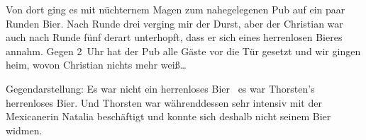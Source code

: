 Von dort ging es mit nüchternem Magen zum nahegelegenen Pub  auf ein paar Runden Bier.
Nach Runde drei verging mir der Durst, aber der Christian war auch nach Runde fünf derart unterhopft, dass er sich eines herrenlosen Bieres annahm.
Gegen 2~Uhr hat der Pub alle Gäste vor die Tür gesetzt und wir gingen heim, wovon Christian nichts mehr weiß\dots

Gegendarstellung: 
Es war nicht \glqq ein herrenloses Bier \grqq\, es war Thorsten's herrenloses Bier. 
Und Thorsten war währenddessen sehr intensiv mit der Mexicanerin Natalia beschäftigt und konnte sich deshalb nicht seinem Bier widmen.
